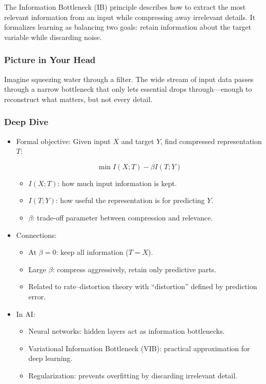\documentclass[
  letterpaper,
  DIV=11,
  numbers=noendperiod]{scrreprt}
\providecommand{\tightlist}{%
  \setlength{\itemsep}{0pt}\setlength{\parskip}{0pt}}
\begin{document}
The Information Bottleneck (IB) principle describes how to extract the
most relevant information from an input while compressing away
irrelevant details. It formalizes learning as balancing two goals:
retain information about the target variable while discarding noise.

\subsubsection{Picture in Your Head}\label{picture-in-your-head-167}

Imagine squeezing water through a filter. The wide stream of input data
passes through a narrow bottleneck that only lets essential drops
through---enough to reconstruct what matters, but not every detail.

\subsubsection{Deep Dive}\label{deep-dive-167}

\begin{itemize}
\item
  Formal objective: Given input \(X\) and target \(Y\), find compressed
  representation \(T\):

  \[
  \min I(X;T) - \beta I(T;Y)
  \]

  \begin{itemize}
  \tightlist
  \item
    \(I(X;T)\): how much input information is kept.
  \item
    \(I(T;Y)\): how useful the representation is for predicting \(Y\).
  \item
    \(\beta\): trade-off parameter between compression and relevance.
  \end{itemize}
\item
  Connections:

  \begin{itemize}
  \tightlist
  \item
    At \(\beta=0\): keep all information (\(T=X\)).
  \item
    Large \(\beta\): compress aggressively, retain only predictive
    parts.
  \item
    Related to rate--distortion theory with ``distortion'' defined by
    prediction error.
  \end{itemize}
\item
  In AI:

  \begin{itemize}
  \tightlist
  \item
    Neural networks: hidden layers act as information bottlenecks.
  \item
    Variational Information Bottleneck (VIB): practical approximation
    for deep learning.
  \item
    Regularization: prevents overfitting by discarding irrelevant
    detail.
  \end{itemize}
\end{itemize}
\end{document}

